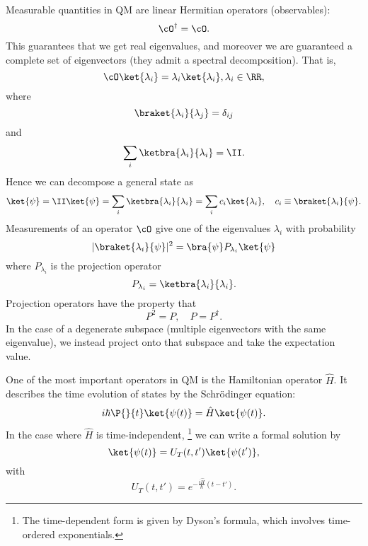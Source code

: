 Measurable quantities in QM are linear Hermitian operators (observables):
\begin{equation}
    \cO^\dagger = \cO.
\end{equation}
This guarantees that we get real eigenvalues, and moreover we are guaranteed a complete set of eigenvectors (they admit a spectral decomposition). That is,
\begin{equation}
    \cO\ket{\lambda_i} = \lambda_i \ket{\lambda_i}, \lambda_i \in \RR,
\end{equation}
where
\begin{equation}
    \braket{\lambda_i}{\lambda_j} = \delta_{ij}
\end{equation}
and
\begin{equation}
    \sum_i \ketbra{\lambda_i}{\lambda_i} = \II.
\end{equation}
Hence we can decompose a general state as
\begin{equation}
    \ket{\psi} = \II \ket{\psi} = \sum_i\ketbra{\lambda_i}{\lambda_i} = \sum_i c_i \ket{\lambda_i}, \quad c_i \equiv \braket{\lambda_i}{\psi}.
\end{equation}
%
Measurements of an operator $\cO$ give one of the eigenvalues $\lambda_i$ with probability
\begin{equation}
    \abs{\braket{\lambda_i}{\psi}}^2 = \bra{\psi} P_{\lambda_i} \ket{\psi}
\end{equation}
where $P_{\lambda_i}$ is the projection operator
\begin{equation}
    P_{\lambda_i} = \ketbra{\lambda_i}{\lambda_i}.
\end{equation}
Projection operators have the property that
\begin{equation}
    P^2 = P, \quad P= P^\dagger.
\end{equation}
In the case of a degenerate subspace (multiple eigenvectors with the same eigenvalue), we instead project onto that subspace and take the expectation value.

One of the most important operators in QM is the Hamiltonian operator $\hat H$. It describes the time evolution of states by the Schr\"odinger equation:
\begin{equation}
    i\hbar \P{}{t} \ket{\psi(t)} = \hat H \ket{\psi(t)}.
\end{equation}
In the case where $\hat H$ is time-independent,%
    \footnote{The time-dependent form is given by Dyson's formula, which involves time-ordered exponentials.}
we can write a formal solution by
\begin{equation}
    \ket{\psi(t)} = U_T(t,t') \ket{\psi(t')},
\end{equation}
with
\begin{equation}
    U_T(t,t') = e^{-\frac{i\hat H}{\hbar}(t-t')}.
\end{equation}

